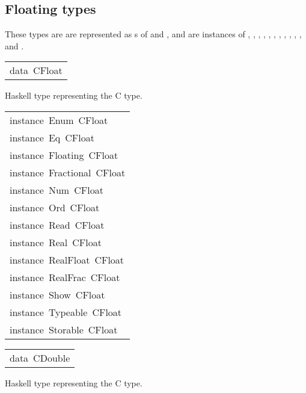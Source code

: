 \subsection{Floating types
}
These types are are represented as s of
  and , and are instances of
 , , , ,
 , , , ,
 , , ,
  and .
\par

\begin{haddockdesc}
\item[\begin{tabular}{@{}l}
data\ CFloat
\end{tabular}]\haddockbegindoc
Haskell type representing the C  type.
\par

\end{haddockdesc}
\begin{haddockdesc}
\item[\begin{tabular}{@{}l}
instance\ Enum\ CFloat\\instance\ Eq\ CFloat\\instance\ Floating\ CFloat\\instance\ Fractional\ CFloat\\instance\ Num\ CFloat\\instance\ Ord\ CFloat\\instance\ Read\ CFloat\\instance\ Real\ CFloat\\instance\ RealFloat\ CFloat\\instance\ RealFrac\ CFloat\\instance\ Show\ CFloat\\instance\ Typeable\ CFloat\\instance\ Storable\ CFloat
\end{tabular}]
\end{haddockdesc}
\begin{haddockdesc}
\item[\begin{tabular}{@{}l}
data\ CDouble
\end{tabular}]\haddockbegindoc
Haskell type representing the C  type.
\par

\end{haddockdesc}
